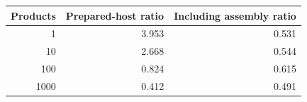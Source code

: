 \begin{tabular}{rrr}
\toprule
Products & Prepared-host ratio & Including assembly ratio \\
\midrule
1 & 3.953 & 0.531 \\
10 & 2.668 & 0.544 \\
100 & 0.824 & 0.615 \\
1000 & 0.412 & 0.491 \\
\bottomrule
\end{tabular}
